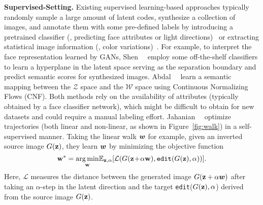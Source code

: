 \noindent\textbf{Supervised-Setting.} 
Existing supervised learning-based approaches typically randomly sample a large amount of latent codes, synthesize a collection of images, and annotate them with some pre-defined labels by  introducing a pretrained classifier (\eg, predicting face attributes or light directions)~\cite{goetschalckx2019ganalyze,shen2020interpreting,abdal2020styleflow,jahanian2020steerability} or extracting statistical image information (\eg, color variations)~\cite{plumerault2020control}.
For example, to interpret the face representation learned by GANs, Shen~\etal~\cite{shen2020interpreting} employ some off-the-shelf classifiers to learn a hyperplane in the latent space serving as the separation boundary and predict semantic scores for synthesized images.
Abdal~\etal~\cite{abdal2020styleflow} learn a semantic mapping between the $\mathcal{Z}$ space and the $\mathcal{W}$ space using  Continuous Normalizing Flows (CNF).
Both methods rely on the availability of attributes (typically obtained by a face classifier network), which might be difficult to obtain for new datasets and could require a manual labeling effort.
Jahanian~\etal~\cite{jahanian2020steerability} optimize trajectories (both linear and non-linear, as shown in Figure~\ref{fig:walk}) 
in a self-supervised manner. 
Taking the linear walk $\boldsymbol{w}$ for example, given an inverted source image $G(\mathbf{z})$, they learn $\boldsymbol{w}$ by minimizing the objective function 
\begin{equation}
\w^* = \underset{\w}{\arg\min} {\E}_{\z,\alpha} [\mathcal{L} ( G(\z\!+\!\alpha \w), \texttt{edit}(G(\z), \alpha))].
\label{eq:optimal_w}
\end{equation}
Here, $\mathcal{L}$ measures the distance between the generated image $G(\mathbf{z}+\alpha \boldsymbol{w})$ after taking an $\alpha$-step in the latent direction and the target \texttt{edit}($G(\mathbf{z}), \alpha$) derived from the source image $G(\mathbf{z})$.

\figwalk

